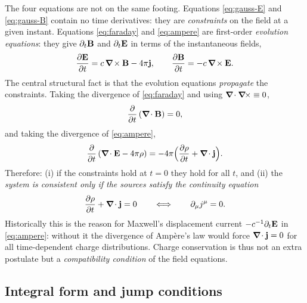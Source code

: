 The four equations are not on the same footing.  Equations
\eqref{eq:gauss-E} and \eqref{eq:gauss-B} contain no time derivatives:
they are \emph{constraints} on the field at a given instant.
Equations \eqref{eq:faraday} and \eqref{eq:ampere} are first-order
\emph{evolution equations}: they give $\partial_t\mathbf{B}$ and $\partial_t\mathbf{E}$ in terms
of the instantaneous fields,
\begin{equation}\label{eq:evolution}
\frac{\partial\mathbf{E}}{\partial t}=c\,\boldsymbol{\nabla}\!\times\mathbf{B}-4\pi\mathbf{j},\qquad
\frac{\partial\mathbf{B}}{\partial t}=-c\,\boldsymbol{\nabla}\!\times\mathbf{E} .
\end{equation}
The central structural fact is that the evolution equations
\emph{propagate} the constraints.  Taking the divergence of
\eqref{eq:faraday} and using $\boldsymbol{\nabla}\!\cdot\boldsymbol{\nabla}\!\times\equiv0$,
\begin{equation}\label{eq:propagate-B}
\frac{\partial}{\partial t}\,(\boldsymbol{\nabla}\!\cdot\mathbf{B})=0 ,
\end{equation}
and taking the divergence of \eqref{eq:ampere},
\begin{equation}\label{eq:propagate-E}
\frac{\partial}{\partial t}\,(\boldsymbol{\nabla}\!\cdot\mathbf{E}-4\pi\rho)
=-4\pi\Big(\frac{\partial\rho}{\partial t}+\boldsymbol{\nabla}\!\cdot\mathbf{j}\Big).
\end{equation}
Therefore: (i) if the constraints hold at $t=0$ they hold for all $t$, and
(ii) the \emph{system is consistent only if the sources satisfy the
continuity equation}
\begin{equation}\label{eq:continuity}
\frac{\partial\rho}{\partial t}+\boldsymbol{\nabla}\!\cdot\mathbf{j}=0\qquad\Longleftrightarrow\qquad
\partial_\mu j^\mu=0 .
\end{equation}
Historically this is the reason for Maxwell's displacement current
$-c^{-1}\partial_t\mathbf{E}$ in \eqref{eq:ampere}: without it the divergence of
Ampère's law would force $\boldsymbol{\nabla}\!\cdot\mathbf{j}=0$ for all time-dependent charge
distributions.  Charge conservation is thus not an extra postulate but a
\emph{compatibility condition} of the field equations.

\subsection{Integral form and jump conditions}

